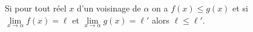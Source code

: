 \begin{thr}
Si pour tout réel $x$ d'un voisinage de $\alpha$ on a $f(x)\leqslant g(x)$ et si $\lim\limits_{x\to \alpha}f(x)=\ell$ et $\lim\limits_{x\to \alpha}g(x)=\ell'$ alors $\ell\leqslant \ell'$.
\end{thr}
%
%
